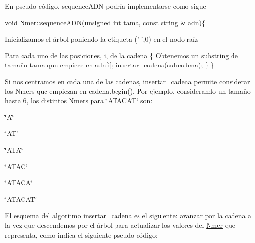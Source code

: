 En pseudo-\/código, sequence\+A\+DN podría implementarse como sigue


\begin{DoxyCode}
\textcolor{keywordtype}{void} \hyperlink{classNmer_a4c29aa3845d91b09f8e0bc3517ca4ec6}{Nmer::sequenceADN}(\textcolor{keywordtype}{unsigned} \textcolor{keywordtype}{int} tama, \textcolor{keyword}{const} \textcolor{keywordtype}{string} & adn)\{

Inicializamos el árbol poniendo la  etiqueta (\textcolor{charliteral}{'-'},0) en el nodo raíz 

    Para cada uno de las posiciones, i,  de la cadena \{
       Obtenemos un substring de tamaño tama que empiece en adn[i];
       insertar\_cadena(subcadena);
     \}
\}
\end{DoxyCode}


Si nos centramos en cada una de las cadenas, insertar\+\_\+cadena permite considerar los Nmers que empiezan en cadena.\+begin(). Por ejemplo, considerando un tamaño hasta 6, los distintos Nmers para \char`\"{}\+A\+T\+A\+C\+A\+T\char`\"{} son\+:


\begin{DoxyEnumerate}
\item \char`\"{}\+A\char`\"{}
\item \char`\"{}\+A\+T\char`\"{}
\item \char`\"{}\+A\+T\+A\char`\"{}
\item \char`\"{}\+A\+T\+A\+C\char`\"{}
\item \char`\"{}\+A\+T\+A\+C\+A\char`\"{}
\item \char`\"{}\+A\+T\+A\+C\+A\+T\char`\"{}
\end{DoxyEnumerate}

El esquema del algoritmo insertar\+\_\+cadena es el siguiente\+: avanzar por la cadena a la vez que descendemos por el árbol para actualizar los valores del \hyperlink{classNmer}{Nmer} que representa, como indica el siguiente pseudo-\/código\+:



